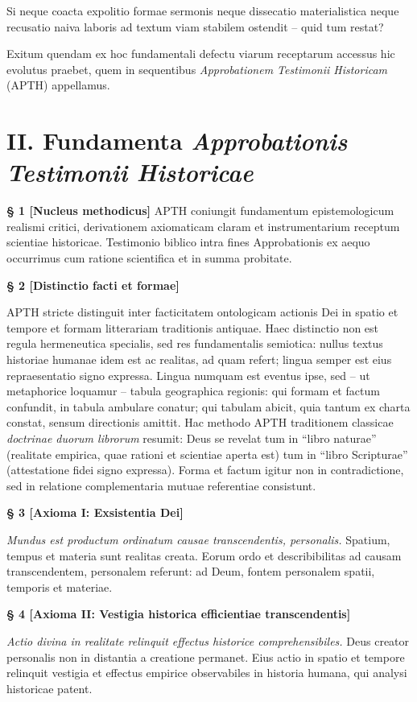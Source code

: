 \documentclass[11pt,a4paper]{article}
\makeatletter
\newcommand{\apth}{{\apthfont APTH}\hspace{0.15em}\xspace}
\newcommand{\apthsec}[3]{%
  \phantomsection%
  \def\@currentlabel{#1}%
  \label{sec:#3}%
  \textbf{§ #1 [#2]}%
}
\makeatother
\begin{document}
Si neque coacta expolitio formae sermonis neque dissecatio materialistica neque recusatio naiva laboris ad textum viam stabilem ostendit -- quid tum restat?

Exitum quendam ex hoc fundamentali defectu viarum receptarum accessus hic evolutus praebet, quem in sequentibus \textit{Approbationem Testimonii Historicam} (\apth) appellamus.

\section*{II. Fundamenta \textit{Approbationis Testimonii Historicae}}

\apthsec{1}{Nucleus methodicus}{kerngedanke} \apth coniungit fundamentum epistemologicum realismi critici, derivationem axiomaticam claram et instrumentarium receptum scientiae historicae. Testimonio biblico intra fines Approbationis ex aequo occurrimus cum ratione scientifica et in summa probitate.

\apthsec{2}{Distinctio facti et formae}{faktum-format}
\apth stricte distinguit inter facticitatem ontologicam actionis Dei in spatio et tempore et formam litterariam traditionis antiquae. Haec distinctio non est regula hermeneutica specialis, sed res fundamentalis semiotica: nullus textus historiae humanae idem est ac realitas, ad quam refert; lingua semper est eius repraesentatio signo expressa. Lingua numquam est eventus ipse, sed -- ut metaphorice loquamur -- tabula geographica regionis: qui formam et factum confundit, in tabula ambulare conatur; qui tabulam abicit, quia tantum ex charta constat, sensum directionis amittit. Hac methodo \apth traditionem classicae \textit{doctrinae duorum librorum} resumit: Deus se revelat tum in ``libro naturae'' (realitate empirica, quae rationi et scientiae aperta est) tum in ``libro Scripturae'' (attestatione fidei signo expressa). Forma et factum igitur non in contradictione, sed in relatione complementaria mutuae referentiae consistunt.

\apthsec{3}{Axioma I: Exsistentia Dei}{axiom-i}
\textit{Mundus est productum ordinatum causae transcendentis, personalis.}
Spatium, tempus et materia sunt realitas creata. Eorum ordo et describibilitas ad causam transcendentem, personalem referunt: ad Deum, fontem personalem spatii, temporis et materiae.

\apthsec{4}{Axioma II: Vestigia historica efficientiae transcendentis}{axiom-ii}
\textit{Actio divina in realitate relinquit effectus historice comprehensibiles.}
Deus creator personalis non in distantia a creatione permanet. Eius actio in spatio et tempore relinquit vestigia et effectus empirice observabiles in historia humana, qui analysi historicae patent.
\end{document}
